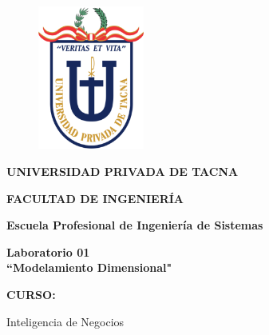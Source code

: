 \documentclass[12pt,letterpaper]{article}
\begin{document}
\begin{titlepage}
    \begin{center}
        \begin{figure}[htb]
            \begin{center}
                \includegraphics[width=3.5cm]{./img/logo}
            \end{center}
        \end{figure}
        \vspace*{0.15in}
        \begin{Large}
            \textbf{UNIVERSIDAD PRIVADA DE TACNA}\\
        \end{Large}
        \vspace*{0.15in}
        \begin{Large}
            \textbf{FACULTAD DE INGENIERÍA} \\
        \end{Large}
        \vspace*{0.1in}
        \begin{Large}
            \textbf{Escuela Profesional de Ingeniería de Sistemas} \\
        \end{Large}
        \vspace*{0.3in}
        \begin{Large}
            \textbf{Laboratorio 01}\\
            \textbf{``Modelamiento Dimensional"}\\
        \end{Large}
        \vspace*{0.2in}
        \begin{Large}
            \textbf{CURSO:} \\
        \end{Large}
        \vspace*{0.1in}
        \begin{large}
            Inteligencia de Negocios\\
        \end{large}

\end{center}
\end{titlepage}
\end{document}
